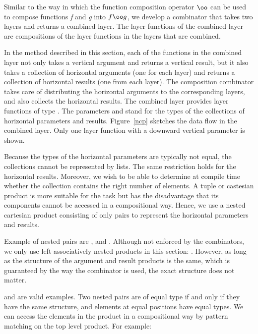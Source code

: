 Similar to the way in which the function composition operator $\oo$ can be used to compose functions {\em f} and {\em g} into $f \oo g$, we develop a  combinator that takes two layers and returns a combined layer. The layer functions of the combined layer are compositions of the layer functions in the layers that are combined.

In the method described in this section, each of the functions in the combined layer not only takes a vertical argument and returns a vertical result, but it also takes a collection of horizontal arguments (one for each layer) and returns a collection of horizontal results (one from each layer). The composition combinator takes care of distributing the horizontal arguments to the corresponding layers, and also collects the horizontal results. The combined layer provides layer functions of type . The parameters  and  stand for the types of the collections of horizontal parameters and results. Figure~\ref{ncp} sketches the data flow in the combined layer. Only one layer function with a downward vertical parameter is shown.

Because the types of the horizontal parameters are typically not equal, the collections cannot be represented by lists. The same restriction holds for the horizontal results. Moreover, we wish to be able to determine at compile time whether the collection contains the right number of elements. A tuple or castesian product is more suitable for the task but has the disadvantage that its components cannot be accessed in a compositional way. Hence, we use a nested cartesian product consisting of only pairs to represent the horizontal parameters and results.

Example of nested pairs are , and . Although not enforced by the combinators, we only use left-associatively nested products in this section: 
. However, as long as the structure of the argument and result products is the same, which is guaranteed by the way the  combinator is used, the exact structure does not matter.


\bc and  are valid examples.\ec
 \bc Two nested pairs are of equal type if and only if they have the same structure, and elements at equal positions have equal types. We can access the elements in the product in a compositional way by pattern matching on the top level product. For example:  \ec

